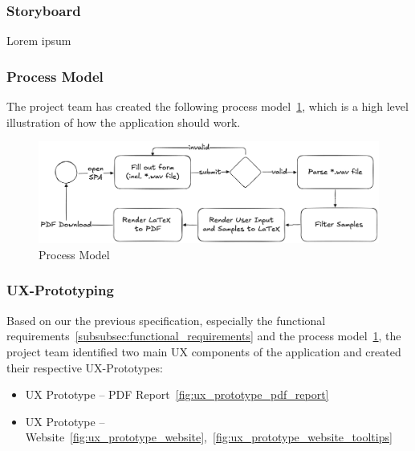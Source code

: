 \subsubsection{Storyboard}\label{subsubsec:storyboard}
Lorem ipsum

\subsubsection{Process Model}\label{subsubsec:process_model}
The project team has created the following process model~\ref{fig:process_model}, which is a high level illustration of how the application should work.

\begin{figure}[H]
    \centering
    \includegraphics[width=\textwidth]{../assets/process_model.png}
    \caption{Process Model}\label{fig:process_model}
\end{figure}

\subsubsection{UX-Prototyping}\label{subsubsec:ux_prototyping}
Based on our the previous specification, especially the functional requirements~\ref{subsubsec:functional_requirements} and the process model~\ref{fig:process_model}, the project team identified two main UX components of the application and created their respective UX-Prototypes:
\begin{itemize}
    \item UX Prototype – PDF Report~\ref{fig:ux_prototype_pdf_report}
    \item UX Prototype – Website~\ref{fig:ux_prototype_website},~\ref{fig:ux_prototype_website_tooltips}
\end{itemize}

